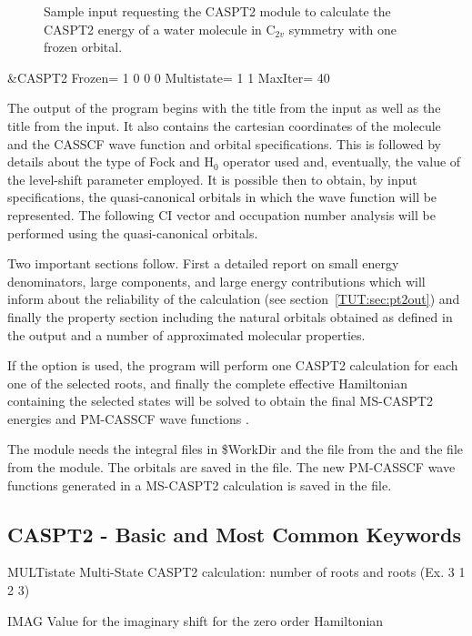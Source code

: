 \begin{figure}[ht]
\caption{Sample input requesting the CASPT2 module to calculate the CASPT2 
energy of a water molecule in C$_{2v}$ symmetry with one frozen orbital.}
\label{fig:caspt2_input}
\end{figure}
\begin{inputlisting}
 &CASPT2
Frozen= 1 0 0 0
Multistate= 1 1
MaxIter= 40
\end{inputlisting}

The output of the  program begins with the title
from the input as well as the title from the  input.
It also contains the cartesian coordinates of the molecule and the
CASSCF wave function and orbital specifications. This is followed by
details about the type of Fock and H$_0$ operator used and, eventually,
the value of the level-shift parameter employed. It is possible then
to obtain, by input specifications, the quasi-canonical orbitals in
which the wave function will be represented. The following CI vector
and occupation number analysis will be performed using the 
quasi-canonical orbitals.

Two important sections follow. First a detailed report on small energy 
denominators, large components, and large energy contributions which will 
inform about the reliability of the calculation 
\ifmanual
(see section~\ref{TUT:sec:pt2out}) 
\fi
and finally the  property section 
including the natural orbitals obtained
as defined in the output and a number of approximated molecular properties.

If the  option is used, the program will perform one CASPT2 
calculation for each one of the selected roots, and finally the complete 
effective Hamiltonian containing the selected states will be solved to obtain
the final MS-CASPT2 energies and PM-CASSCF wave functions \cite{Finley:98b}.

The  module needs the integral files in \$WorkDir and the 
 file from the and the  file from the 
 module. The orbitals are saved in the  file.
The new PM-CASSCF wave functions generated in a MS-CASPT2 calculation
is saved in the  file.

\subsection{CASPT2 - Basic and Most Common Keywords}
\begin{keywordlist}
\item[MULTistate] Multi-State CASPT2 calculation: number of roots and roots (Ex. 3 1 2 3)
\item[IMAG] Value for the imaginary shift for the zero order Hamiltonian 
\item[]
\end{keywordlist}

